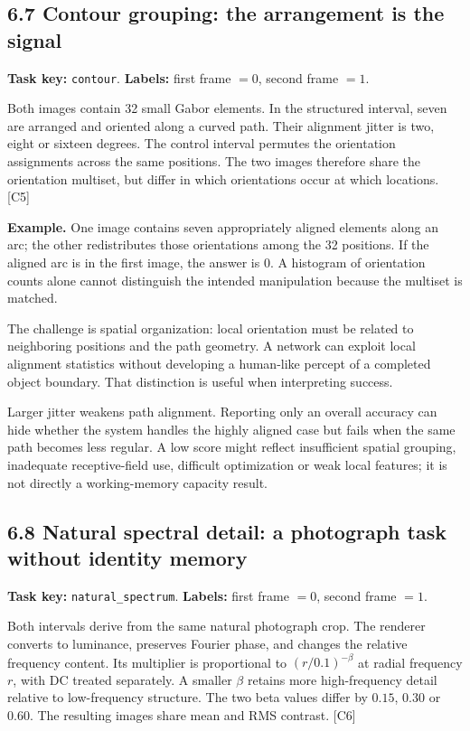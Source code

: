 \documentclass[
  11pt,
]{article}
\let\oldsubsection\subsection
\renewcommand{\subsection}{\Needspace{6\baselineskip}\oldsubsection}
\begin{document}
\subsection{6.7 Contour grouping: the arrangement is the
signal}\label{contour-grouping-the-arrangement-is-the-signal}

\textbf{Task key:} \texttt{contour}. \textbf{Labels:} first frame
\(=0\), second frame \(=1\).

Both images contain 32 small Gabor elements. In the structured interval,
seven are arranged and oriented along a curved path. Their alignment
jitter is two, eight or sixteen degrees. The control interval permutes
the orientation assignments across the same positions. The two images
therefore share the orientation multiset, but differ in which
orientations occur at which locations. {[}C5{]}

\textbf{Example.} One image contains seven appropriately aligned
elements along an arc; the other redistributes those orientations among
the 32 positions. If the aligned arc is in the first image, the answer
is 0. A histogram of orientation counts alone cannot distinguish the
intended manipulation because the multiset is matched.

The challenge is spatial organization: local orientation must be related
to neighboring positions and the path geometry. A network can exploit
local alignment statistics without developing a human-like percept of a
completed object boundary. That distinction is useful when interpreting
success.

Larger jitter weakens path alignment. Reporting only an overall accuracy
can hide whether the system handles the highly aligned case but fails
when the same path becomes less regular. A low score might reflect
insufficient spatial grouping, inadequate receptive-field use, difficult
optimization or weak local features; it is not directly a working-memory
capacity result.

\subsection{6.8 Natural spectral detail: a photograph task without
identity
memory}\label{natural-spectral-detail-a-photograph-task-without-identity-memory}

\textbf{Task key:} \texttt{natural\_spectrum}. \textbf{Labels:} first
frame \(=0\), second frame \(=1\).

Both intervals derive from the same natural photograph crop. The
renderer converts to luminance, preserves Fourier phase, and changes the
relative frequency content. Its multiplier is proportional to
\((r/0.1)^{-\beta}\) at radial frequency \(r\), with DC treated
separately. A smaller \(\beta\) retains more high-frequency detail
relative to low-frequency structure. The two beta values differ by
\(0.15\), \(0.30\) or \(0.60\). The resulting images share mean and RMS
contrast. {[}C6{]}
\end{document}
